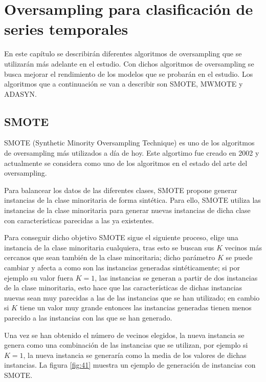 \chapter{Oversampling para clasificación de series temporales}
En este capítulo se describirán diferentes algoritmos de oversampling que se utilizarán más adelante en el estudio. Con dichos algoritmos de oversampling se busca mejorar el rendimiento de los modelos que se probarán en el estudio. Los algoritmos que a continuación se van a describir son SMOTE, MWMOTE y ADASYN.

\section{SMOTE}
SMOTE (Synthetic Minority Oversampling Technique) \cite{chawla2002smote} es uno de los algoritmos de oversampling más utilizados a día de hoy. Este algortimo fue creado en 2002 y actualmente se considera como uno de los algoritmos en el estado del arte del oversampling.\newline

Para balancear los datos de las diferentes clases, SMOTE propone generar instancias de la clase minoritaria de forma sintética. Para ello, SMOTE utiliza las instancias de la clase minoritaria para generar nuevas instancias de dicha clase con características parecidas a las ya existentes.\newline

Para conseguir dicho objetivo SMOTE sigue el siguiente proceso, elige una instancia de la clase minoritaria cualquiera, tras esto se buscan sus $K$ vecinos más cercanos que sean también de la clase minoritaria; dicho parámetro $K$ se puede cambiar y afecta a como son las instancias generadas sintéticamente; si por ejemplo su valor fuera $K=1$, las instancias se generan a partir de dos instancias de la clase minoritaria, esto hace que las características de dichas instancias nuevas sean muy parecidas a las de las instancias que se han utilizado; en cambio si $K$ tiene un valor muy grande entonces las instancias generadas tienen menos parecido a las instancias con las que se han generado.\newline

Una vez se han obtenido el número de vecinos elegidos, la nueva instancia se genera como una combinación de las instancias que se utilizan, por ejemplo si $K=1$, la nueva instancia se generaría como la media de los valores de dichas instancias. La figura \ref{fig:41} muestra un ejemplo de generación de instancias con SMOTE.\newline

